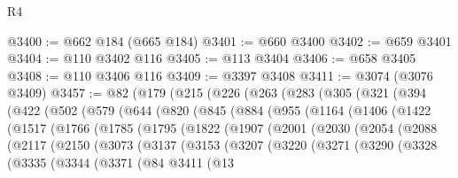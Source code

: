 \begin{lexlean}{R4}
\begin{coremodule}
@3400 := @662 @184 (@665 @184)
@3401 := @660 @3400
@3402 := @659 @3401
@3404 := @110 @3402 @116
@3405 := @113 @3404
@3406 := @658 @3405
@3408 := @110 @3406 @116
@3409 := @3397 @3408
@3411 := @3074 (@3076 @3409)
@3457 := @82
    (@179
      (@215
        (@226
          (@263
            (@283
              (@305
                (@321
                  (@394
                    (@422
                      (@502
                        (@579
                          (@644
                            (@820
                              (@845
                                (@884
                                  (@955
                                    (@1164
                                      (@1406
                                        (@1422
                                          (@1517
                                            (@1766
                                              (@1785
                                                (@1795
                                                  (@1822
                                                    (@1907
                                                      (@2001
                                                        (@2030
                                                          (@2054
                                                            (@2088
                                                              (@2117
                                                                (@2150
                                                                  (@3073
                                                                    (@3137
                                                                      (@3153
                                                                        (@3207
                                                                          (@3220
                                                                            (@3271
                                                                              (@3290
                                                                                (@3328
                                                                                  (@3335
                                                                                    (@3344
                                                                                      (@3371
                                                                                        (@84
                                                                                          @3411
                                                                                          (@13

\end{coremodule}
\end{lexlean}
